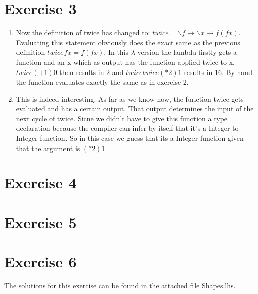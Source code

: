 \documentclass{article}
\begin{document}
\section*{Exercise 3}
\begin{enumerate}
  \item
  Now the definition of twice has changed to: $twice = \backslash f \rightarrow \backslash x \rightarrow f (f x)$.
  Evaluating this statement obviously does the exact same as the previous definition $twice f x = f(f x)$. In this $\lambda$ version the lambda firstly gets a function and an x which as output has the function applied twice to x.
  \newline
  $twice (+1) 0$ then results in 2 and $twice twice (*2) 1$ results in 16. By hand the function evaluates exactly the same as in exercise 2.
  \item This is indeed interesting. As far as we know now, the function twice gets evaluated and has a certain output. That output determines the input of the next cycle of twice. Sicne we didn't have to give this function a type declaration because the compiler can infer by itself that it's a Integer to Integer function. So in this case we guess that its a Integer function given that the argument is $(*2) 1$.
\end{enumerate}

\section*{Exercise 4}

\section*{Exercise 5}

\section*{Exercise 6}
The solutions for this exercise can be found in the attached file Shapes.lhs.
\end{document}
